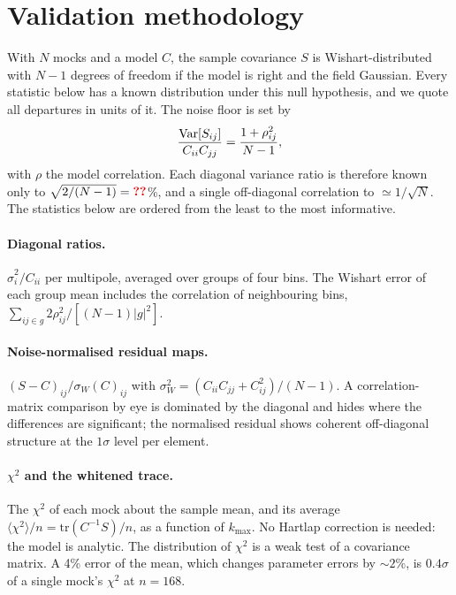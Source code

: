 \section{Validation methodology}
\label{sec:method}

With $N$ mocks and a model $C$, the sample covariance $S$ is Wishart-distributed with $N-1$ degrees of freedom if the model is right and the field Gaussian. Every statistic below has a known distribution under this null hypothesis, and we quote all departures in units of it. The noise floor is set by
\begin{equation}
  \frac{{\rm Var}[S_{ij}]}{C_{ii}C_{jj}} = \frac{1+\rho_{ij}^2}{N-1},
\end{equation}
with $\rho$ the model correlation. Each diagonal variance ratio is therefore known only to $\sqrt{2/(N-1)}=\val{wishart}$\%, and a single off-diagonal correlation to $\simeq1/\sqrt N$. The statistics below are ordered from the least to the most informative.

\paragraph{Diagonal ratios.} $\hat\sigma^2_i/C_{ii}$ per multipole, averaged over groups of four bins. The Wishart error of each group mean includes the correlation of neighbouring bins, $\sum_{ij\in g}2\rho_{ij}^2/[(N-1)|g|^2]$.

\paragraph{Noise-normalised residual maps.} $(S-C)_{ij}/\sigma_W(C)_{ij}$ with $\sigma_W^2=(C_{ii}C_{jj}+C_{ij}^2)/(N-1)$. A correlation-matrix comparison by eye is dominated by the diagonal and hides where the differences are significant; the normalised residual shows coherent off-diagonal structure at the $1\sigma$ level per element.

\paragraph{$\chi^2$ and the whitened trace.} The $\chi^2$ of each mock about the sample mean, and its average $\langle\chi^2\rangle/n=\mathrm{tr}(C^{-1}S)/n$, as a function of $k_{\max}$. No Hartlap correction is needed: the model is analytic. The distribution of $\chi^2$ is a weak test of a covariance matrix. A 4\% error of the mean, which changes parameter errors by $\sim2$\%, is $0.4\sigma$ of a single mock's $\chi^2$ at $n=168$.

